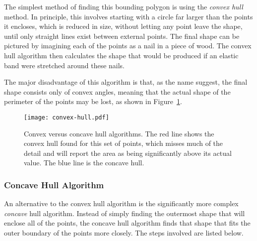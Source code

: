 The simplest method of finding this bounding polygon is using the \emph{convex
hull} method\cite{barber1996quickhull}. In principle, this involves starting
with a circle far larger than the points it encloses, which is reduced in size,
without letting any point leave the shape, until only straight lines exist
between external points. The final shape can be pictured by imagining each of
the points as a nail in a piece of wood. The convex hull algorithm then
calculates the shape that would be produced if an elastic band were stretched
around these nails.

The major disadvantage of this algorithm is that, as the name suggest, the
final shape consists only of convex angles, meaning that the actual shape of
the perimeter of the points may be lost, as shown in
Figure~\ref{fig:convex-hull}.

\begin{figure}[tbhp]
	\centering
	\texttt{[image: convex-hull.pdf]}

	\caption[Convex versus concave hull algorithms.]{Convex versus concave hull
		algorithms. The red line shows the convex hull found for this set of
		points, which misses much of the detail and will report the area as
		being significantly above its actual value. The blue line is the
		concave hull.}\label{fig:convex-hull}
\end{figure}

\subsubsection*{Concave Hull Algorithm}
\label{ssub:Concave Hull Algorithm}

An alternative to the convex hull algorithm is the significantly more complex
\emph{concave} hull algorithm\cite{moreira2007concave}. Instead of simply
finding the outermost shape that will enclose all of the points, the concave
hull algorithm finds that shape that fits the outer boundary of the points more
closely. The steps involved are listed below.

